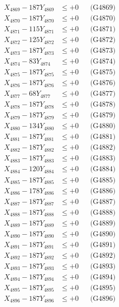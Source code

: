 \documentclass[a4paper,10pt]{article}
\begin{document}
{\begin{align}
X_{4869} - 187Y_{4869} &\leq +0 && \text{(G4869)} \\
X_{4870} - 187Y_{4870} &\leq +0 && \text{(G4870)} \\
\allowbreak
X_{4871} - 115Y_{4871} &\leq +0 && \text{(G4871)} \\
X_{4872} - 125Y_{4872} &\leq +0 && \text{(G4872)} \\
X_{4873} - 187Y_{4873} &\leq +0 && \text{(G4873)} \\
X_{4874} - 83Y_{4874} &\leq +0 && \text{(G4874)} \\
X_{4875} - 187Y_{4875} &\leq +0 && \text{(G4875)} \\
X_{4876} - 187Y_{4876} &\leq +0 && \text{(G4876)} \\
X_{4877} - 68Y_{4877} &\leq +0 && \text{(G4877)} \\
X_{4878} - 187Y_{4878} &\leq +0 && \text{(G4878)} \\
X_{4879} - 187Y_{4879} &\leq +0 && \text{(G4879)} \\
X_{4880} - 134Y_{4880} &\leq +0 && \text{(G4880)} \\
\allowbreak
X_{4881} - 187Y_{4881} &\leq +0 && \text{(G4881)} \\
X_{4882} - 187Y_{4882} &\leq +0 && \text{(G4882)} \\
X_{4883} - 187Y_{4883} &\leq +0 && \text{(G4883)} \\
X_{4884} - 120Y_{4884} &\leq +0 && \text{(G4884)} \\
X_{4885} - 187Y_{4885} &\leq +0 && \text{(G4885)} \\
X_{4886} - 178Y_{4886} &\leq +0 && \text{(G4886)} \\
X_{4887} - 187Y_{4887} &\leq +0 && \text{(G4887)} \\
X_{4888} - 187Y_{4888} &\leq +0 && \text{(G4888)} \\
X_{4889} - 187Y_{4889} &\leq +0 && \text{(G4889)} \\
X_{4890} - 187Y_{4890} &\leq +0 && \text{(G4890)} \\
\allowbreak
X_{4891} - 187Y_{4891} &\leq +0 && \text{(G4891)} \\
X_{4892} - 187Y_{4892} &\leq +0 && \text{(G4892)} \\
X_{4893} - 187Y_{4893} &\leq +0 && \text{(G4893)} \\
X_{4894} - 187Y_{4894} &\leq +0 && \text{(G4894)} \\
X_{4895} - 187Y_{4895} &\leq +0 && \text{(G4895)} \\
X_{4896} - 187Y_{4896} &\leq +0 && \text{(G4896)} \\

\end{align}}
\end{document}
